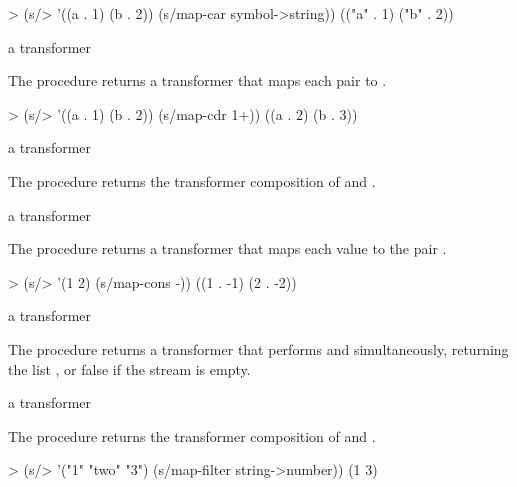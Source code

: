 \codebegin
> (s/> '((a . 1) (b . 2)) (s/map-car symbol->string))
(("a" . 1) ("b" . 2))
\codeend

\begin{procedure}
\end{procedure}
\returns{} a transformer

The  procedure returns a transformer that maps each pair
 to .

\codebegin
> (s/> '((a . 1) (b . 2)) (s/map-cdr 1+))
((a . 2) (b . 3))
\codeend

\begin{procedure}
\end{procedure}
\returns{} a transformer

The  procedure returns the transformer composition of  and .

\begin{procedure}
\end{procedure}
\returns{} a transformer

The  procedure returns a transformer that maps each value  to the
pair .

\codebegin
> (s/> '(1 2) (s/map-cons -))
((1 . -1) (2 . -2))
\codeend

\begin{procedure}
\end{procedure}
\returns{} a transformer

The  procedure returns a transformer that performs 
and  simultaneously, returning the list , or
false if the stream is empty.

\begin{procedure}
\end{procedure}
\returns{} a transformer

The  procedure returns the transformer composition of  and .

\codebegin
> (s/> '("1" "two" "3") (s/map-filter string->number))
(1 3)
\codeend

